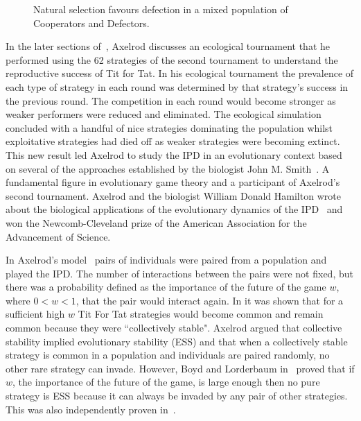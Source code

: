 \documentclass{article}
\theoremstyle{definition}
\begin{document}
\begin{figure}[!hbtp]
    \centering
    
    \caption{Natural selection favours defection in a mixed population of Cooperators
    and Defectors.}\label{fig:natural_selection_diagram}
\end{figure}

In the later sections of~\cite{Axelrod1980b}, Axelrod discusses an
ecological tournament that he performed using the 62 strategies of the second
tournament to understand the reproductive success of Tit for Tat. In his
ecological tournament the prevalence of each type of strategy in each round was
determined by that strategy's success in the previous round. The competition in
each round would become stronger as weaker performers were reduced and
eliminated. The ecological simulation concluded with a handful of nice
strategies dominating the population whilst exploitative strategies had died off
as weaker strategies were becoming extinct. This new result led Axelrod to
study the IPD in an evolutionary context based on several of the approaches
established by the biologist John M. Smith~\cite{Smith1974,
Smith1979, Smith1973}. A fundamental figure in evolutionary game theory and a
participant of Axelrod's second tournament. Axelrod and the biologist William
Donald Hamilton wrote about the biological applications of the evolutionary
dynamics of the IPD~\cite{Axelrod1984} and won the
Newcomb-Cleveland prize of the American Association for the Advancement of
Science.

In Axelrod's model~\cite{axelrod1981} pairs of individuals were paired from a
population and played the IPD. The number of interactions between the pairs were
not fixed, but there was a probability defined as the importance of the future
of the game \(w\), where \(0 < w < 1\), that the pair would interact again. In
\cite{axelrod1981} it was shown that for
a sufficient high \(w\) Tit For Tat strategies
would become common and remain common because they were ``collectively stable".
Axelrod argued that collective stability implied evolutionary stability (ESS)
and that when a collectively stable strategy is common in a population and
individuals are paired randomly, no other rare strategy can invade. However,
Boyd and Lorderbaum in~\cite{Boyd1987} proved that if \(w\), the importance of the
future of the game, is large enough then no pure strategy is ESS because it can
always be invaded by any pair of other strategies. This was also independently
proven in~\cite{Pudaite1987}.
\end{document}
